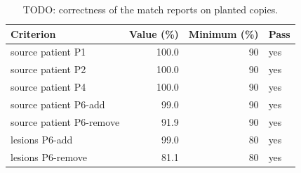 \begin{table}
\centering
\small
\begin{tabular}{lrrl}
\toprule
Criterion & Value (\%) & Minimum (\%) & Pass \\
\midrule
source patient P1 & 100.0 & 90 & yes \\
source patient P2 & 100.0 & 90 & yes \\
source patient P4 & 100.0 & 90 & yes \\
source patient P6-add & 99.0 & 90 & yes \\
source patient P6-remove & 91.9 & 90 & yes \\
lesions P6-add & 99.0 & 80 & yes \\
lesions P6-remove & 81.1 & 80 & yes \\
\bottomrule
\end{tabular}
\caption{TODO: correctness of the match reports on planted copies.}
\label{tab:correctness}
\end{table}
